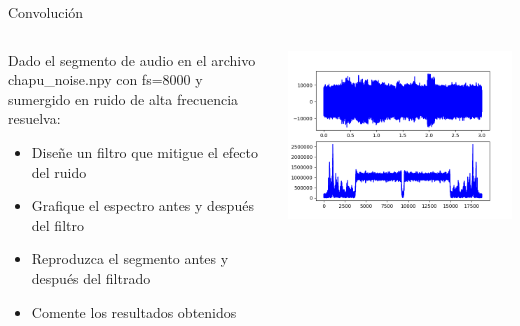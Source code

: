  \begin{frame}{Convolución}
   \begin{columns}[c]
      \hspace{2pt}
      \begin{column}{.6\textwidth}
    Dado el segmento de audio en el archivo chapu\_noise.npy con fs=8000 y sumergido en ruido de alta frecuencia resuelva:
    \begin{itemize}
       \item{Diseñe un filtro que mitigue el efecto del ruido}
       \item{Grafique el espectro antes y después del filtro}
       \item{Reproduzca el segmento antes y después del filtrado}
       \item{Comente los resultados obtenidos}
    \end{itemize}
      \end{column}
      \hspace{2pt}
      \vrule
      \begin{column}{.4\textwidth}
         \centering\includegraphics[width=1.0\textwidth]{tp2/chapu}
      \end{column}
      \hspace{2pt}
   \end{columns}
    \vfill
 \end{frame}


